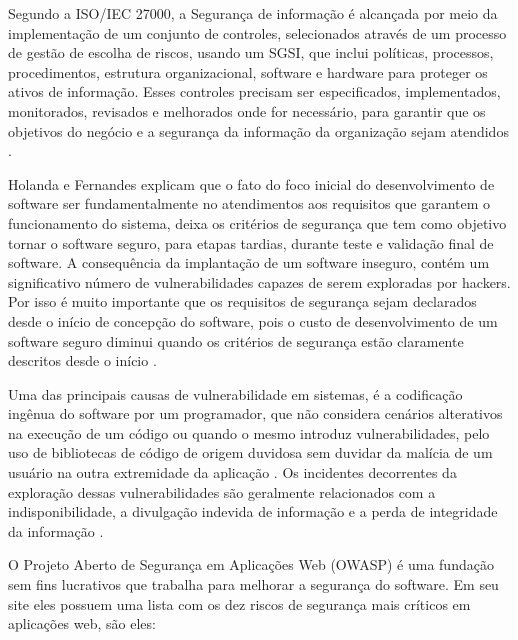 Segundo a ISO/IEC 27000, a Segurança de informação é alcançada por meio da implementação de um conjunto de controles, selecionados através de um processo de gestão de escolha de riscos, usando um SGSI, que inclui políticas, processos, procedimentos, estrutura organizacional, software e hardware para proteger os ativos de informação. Esses controles precisam ser especificados, implementados, monitorados, revisados e melhorados onde for necessário, para garantir que  os objetivos do negócio e a segurança da informação da organização sejam atendidos \cite{ISO27000}.



Holanda e Fernandes \cite{holanda2009segurancca} explicam que o fato do foco inicial do desenvolvimento de software ser fundamentalmente no atendimentos aos requisitos que garantem o funcionamento do sistema, deixa os critérios de segurança que tem como objetivo tornar o software seguro, para etapas tardias, durante teste e validação final de software. A consequência da implantação de um software inseguro, contém um significativo número de vulnerabilidades capazes de serem exploradas por hackers. Por isso é muito importante que os requisitos de segurança sejam declarados desde o início de concepção do software, pois o custo de desenvolvimento de um software seguro diminui quando os critérios de segurança estão claramente descritos desde o início \cite{holanda2009segurancca}.

Uma das principais causas de vulnerabilidade em sistemas, é a codificação ingênua do software por um programador, que não considera cenários alterativos na execução de um código ou quando o mesmo introduz vulnerabilidades, pelo uso de bibliotecas de código de origem duvidosa sem duvidar da malícia de um usuário na outra extremidade da aplicação \cite{holanda2009segurancca}. Os incidentes decorrentes da exploração dessas vulnerabilidades são geralmente relacionados com a indisponibilidade, a divulgação indevida de informação e a perda de integridade da informação \cite{holanda2009segurancca}.

O Projeto Aberto de Segurança em Aplicações Web (OWASP) é uma fundação sem fins lucrativos que trabalha para melhorar a segurança do software. Em seu site eles possuem uma lista \cite{owasp} com os dez riscos de segurança mais críticos em aplicações web, são eles:

